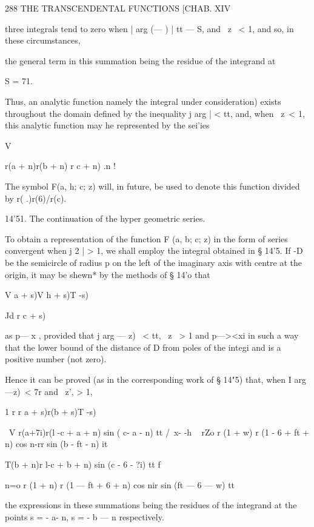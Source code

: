 288 THE TRANSCENDENTAL FUNCTIONS [CHAB. XIV 

three integrals tend to zero when | arg (—  ) |   tt — S, and \ z \ < 1, and so, in 
these circumstances, 

the general term in this summation being the residue of the integrand at 

S = 71. 

Thus, an analytic function  namely the integral under consideration) exists 
throughout the domain defined by the inequality j arg   | < tt, and, when \ z\ <  1, 
this analytic function may he represented by the sei'ies 



V 



r(a + n)r(b + n) 
r  c + n) .n ! 



The symbol F(a, h; c; z) will, in future, be used to denote this function 
divided by r( .)r(6)/r(c). 

14'51. The continuation of the hyper geometric series. 

To obtain a representation of the function F (a, b; c; z) in the form of 
series convergent when j 2  | > 1, we shall employ the integral obtained in 
§ 14'5. If -D be the semicircle of radius p on the left of the imaginary axis 
with centre at the origin, it may be shewn* by the methods of § 14'o that 

V a + s)V h + s)T -s) 



Jd r c + s)   



as p—  x , provided that j arg  — z) \ < tt, \ z \ > 1 and p—><xi in such a way 
that the lower bound of the distance of D from poles of the integi and is 
a positive number (not zero). 

Hence it can be proved (as in the corresponding work of § 14"5) that, when 
I arg  —z)\ < 7r and \ z', > 1, 

1 r r a + s)r(b + s)T -s) 

\  V r(a+7i)r(l -c + a + n) sin ( c- a - n) tt /\  x- -h 
~ rZo r (1 + w) r (1 - 6 + ft + n) cos n-rr sin (b - ft - n) it 

  T(b + n)r l-c + b + n) sin (c - 6 - ?i) tt f \   

n=o r (1 + n) r (1 — ft + 6 + n) cos nir sin (ft — 6 — w) tt 

the expressions in these summations being the residues of the integrand at 
the points s = - a- n, s = - b — n respectively. 


